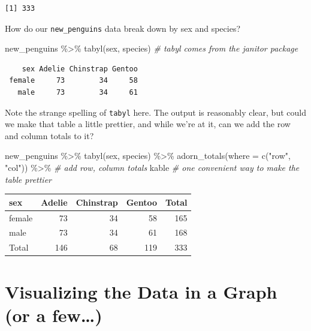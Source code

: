 \documentclass[
]{book}
\newenvironment{Shaded}{\begin{snugshade}}{\end{snugshade}}
\newcommand{\AttributeTok}[1]{\textcolor[rgb]{0.77,0.63,0.00}{#1}}
\newcommand{\CommentTok}[1]{\textcolor[rgb]{0.56,0.35,0.01}{\textit{#1}}}
\newcommand{\FunctionTok}[1]{\textcolor[rgb]{0.00,0.00,0.00}{#1}}
\newcommand{\NormalTok}[1]{#1}
\newcommand{\SpecialCharTok}[1]{\textcolor[rgb]{0.00,0.00,0.00}{#1}}
\newcommand{\StringTok}[1]{\textcolor[rgb]{0.31,0.60,0.02}{#1}}
\begin{document}
\begin{verbatim}
[1] 333
\end{verbatim}

How do our \texttt{new\_penguins} data break down by sex and species?

\begin{Shaded}
\begin{Highlighting}[]
\NormalTok{new\_penguins }\SpecialCharTok{\%\textgreater{}\%} 
    \FunctionTok{tabyl}\NormalTok{(sex, species) }\CommentTok{\# tabyl comes from the janitor package}
\end{Highlighting}
\end{Shaded}

\begin{verbatim}
    sex Adelie Chinstrap Gentoo
 female     73        34     58
   male     73        34     61
\end{verbatim}

Note the strange spelling of \texttt{tabyl} here. The output is reasonably clear, but could we make that table a little prettier, and while we're at it, can we add the row and column totals to it?

\begin{Shaded}
\begin{Highlighting}[]
\NormalTok{new\_penguins }\SpecialCharTok{\%\textgreater{}\%} 
    \FunctionTok{tabyl}\NormalTok{(sex, species) }\SpecialCharTok{\%\textgreater{}\%}
    \FunctionTok{adorn\_totals}\NormalTok{(}\AttributeTok{where =} \FunctionTok{c}\NormalTok{(}\StringTok{"row"}\NormalTok{, }\StringTok{"col"}\NormalTok{)) }\SpecialCharTok{\%\textgreater{}\%} \CommentTok{\# add row, column totals}
\NormalTok{    kable  }\CommentTok{\# one convenient way to make the table prettier}
\end{Highlighting}
\end{Shaded}

\begin{tabular}{l|r|r|r|r}
\hline
sex & Adelie & Chinstrap & Gentoo & Total\\
\hline
female & 73 & 34 & 58 & 165\\
\hline
male & 73 & 34 & 61 & 168\\
\hline
Total & 146 & 68 & 119 & 333\\
\hline
\end{tabular}

\hypertarget{visualizing-the-data-in-a-graph-or-a-few}{%
\section{Visualizing the Data in a Graph (or a few\ldots)}\label{visualizing-the-data-in-a-graph-or-a-few}}
\end{document}
